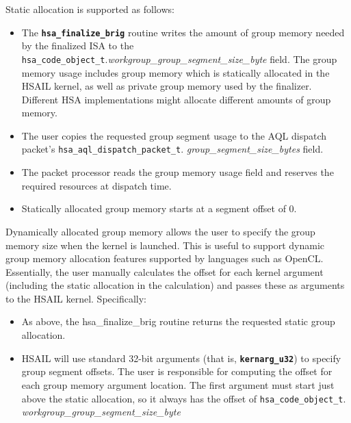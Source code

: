 \documentclass{book}
\newcommand{\diffblock}[1]{#1}
\newcommand{\ttbf}[1]{\diffblock{\texttt{\textbf{#1}}}}
\begin{document}
\begin{appendices}
Static allocation is supported as follows\-:

\begin{itemize}

\item The \ttbf{hsa\_finalize\_brig} routine writes the amount of
group memory needed by the finalized I\-S\-A to the
\texttt{hsa\_code\_object\_t}.{\itshape workgroup\_group\_segment\_size\_byte}
field.  The group memory usage includes group memory which is
statically allocated in the H\-S\-A\-I\-L kernel, as well as private
group memory used by the finalizer. Different H\-S\-A
implementations might allocate different amounts of group memory.

\item The user copies the requested group segment usage to the
A\-Q\-L dispatch packet's \texttt{hsa\_aql\_dispatch\_packet\_t}.{\itshape
group\_segment\_size\_bytes} field.

\item The packet processor reads the group memory usage field and
reserves the required resources at dispatch time.

\item Statically allocated group memory starts at a segment offset
of 0.

\end{itemize}

Dynamically allocated group memory allows the user to specify the
group memory size when the kernel is launched. This is useful to
support dynamic group memory allocation features supported by
languages such as Open\-C\-L. Essentially, the user manually
calculates the offset for each kernel argument (including the static
allocation in the calculation) and passes these as arguments to the
H\-S\-A\-I\-L kernel. Specifically\-:

\begin{itemize}

\item As above, the {hsa\_finalize\_brig} routine returns the
requested static group allocation.

\item H\-S\-A\-I\-L will use standard 32-\/bit arguments (that is,
\ttbf{kernarg\_u32}) to specify group segment offsets. The user is
responsible for computing the offset for each group memory argument
location. The first argument must start just above the static
allocation, so it always has the offset of
\texttt{hsa\_code\_object\_t}.{\itshape
workgroup\_group\_segment\_size\_byte}


\end{itemize}
\end{appendices}
\end{document}
